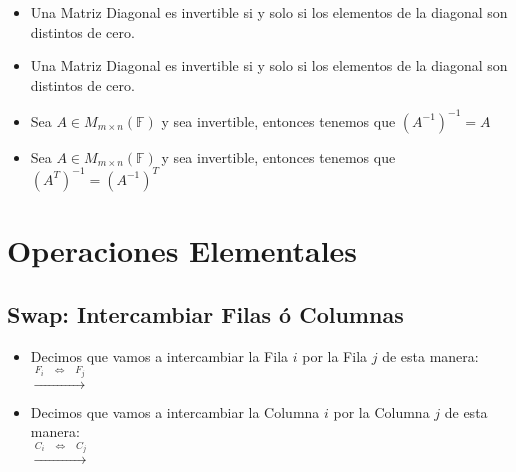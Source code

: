 \documentclass[12pt, fleqn]{report}                             %
\newenvironment{SmallIndentation}[1][0.75em]                    %
    {\begin{adjustwidth}{#1}{}\begin{footnotesize}}                 %
    {\end{footnotesize}\end{adjustwidth}}                           %
\DeclareMathOperator \Space {\quad}                             %
\DeclareMathOperator \MiniSpace {\;}                            %
\newcommand \lequal {\MiniSpace \Leftrightarrow \MiniSpace}     %
\newcommand \longto {\longrightarrow}                           %
\begin{document}
\begin{itemize}
\begin{SmallIndentation}[1em]
                        \end{SmallIndentation}

                    \clearpage

                    \item Una Matriz Diagonal es invertible si y solo si los elementos de la diagonal
                        son distintos de cero.

                    \item Una Matriz Diagonal es invertible si y solo si los elementos de la diagonal
                        son distintos de cero.

                    \item Sea $A \in M_{m \times n}(\mathbb{F})$ y sea invertible, entonces tenemos
                        que $(A^{-1})^{-1} = A$

                    \item Sea $A \in M_{m \times n}(\mathbb{F})$ y sea invertible, entonces tenemos
                        que $(A^T)^{-1} = (A^{-1})^T$

                \end{itemize}
            






        \clearpage
        \section{Operaciones Elementales}

            \subsection{Swap: Intercambiar Filas ó Columnas}

                \begin{itemize}
                    \item
                        Decimos que vamos a intercambiar la Fila $i$ por la Fila $j$ de
                        esta manera:\\
                        $\overset{F_i \lequal F_j}{\longto}$

                    \item
                        Decimos que vamos a intercambiar la Columna $i$ por la Columna $j$ de
                        esta manera:\\
                        $\overset{C_i \lequal C_j}{\longto}$
                \end{itemize}
\end{document}
